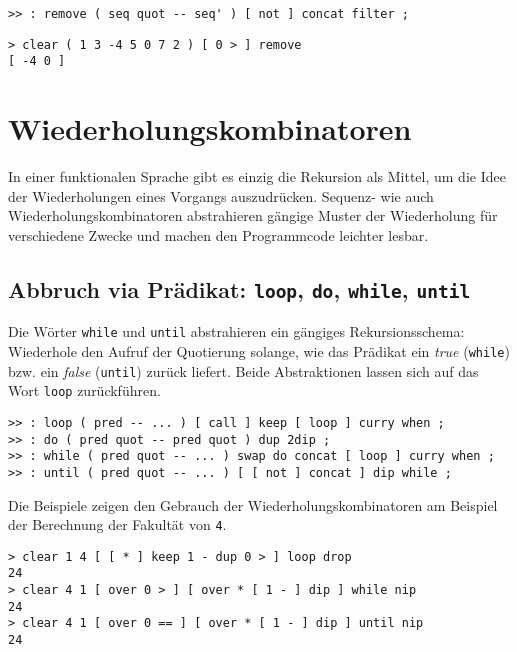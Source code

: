 \begin{verbatim}
>> : remove ( seq quot -- seq' ) [ not ] concat filter ;
\end{verbatim}

\begin{verbatim}
> clear ( 1 3 -4 5 0 7 2 ) [ 0 > ] remove
[ -4 0 ]
\end{verbatim}

\section{Wiederholungskombinatoren}

In einer funktionalen Sprache gibt es einzig die Rekursion als Mittel, um die Idee der Wiederholungen eines Vorgangs auszudrücken. Sequenz- wie auch Wiederholungskombinatoren abstrahieren gängige Muster der Wiederholung für verschiedene Zwecke und machen den Programmcode leichter lesbar.

\subsection{Abbruch via Prädikat: \texttt{loop}, \texttt{do}, \texttt{while}, \texttt{until}}

Die Wörter \verb|while| und \verb|until| abstrahieren ein gängiges Rekursionsschema: Wiederhole den Aufruf der Quotierung solange, wie das Prädikat ein \emph{true} (\verb|while|) bzw. ein \emph{false} (\verb|until|) zurück liefert. Beide Abstraktionen lassen sich auf das Wort \verb|loop| zurückführen.

\begin{verbatim}
>> : loop ( pred -- ... ) [ call ] keep [ loop ] curry when ;  
>> : do ( pred quot -- pred quot ) dup 2dip ;
>> : while ( pred quot -- ... ) swap do concat [ loop ] curry when ;
>> : until ( pred quot -- ... ) [ [ not ] concat ] dip while ;
\end{verbatim}

Die Beispiele zeigen den Gebrauch der Wiederholungskombinatoren am Beispiel der Berechnung der Fakultät von \verb|4|.

\begin{verbatim}
> clear 1 4 [ [ * ] keep 1 - dup 0 > ] loop drop
24
> clear 4 1 [ over 0 > ] [ over * [ 1 - ] dip ] while nip
24
> clear 4 1 [ over 0 == ] [ over * [ 1 - ] dip ] until nip
24
\end{verbatim}

